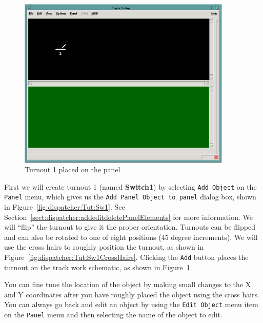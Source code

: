 \begin{figure}[hbpt] 
\begin{centering}
\includegraphics[width=4in]{DISPSimpleTutPanel1.png} 
\caption{Turnout 1 placed on the panel} 
\label{fig:dispatcher:Tut:panel1} 
\end{centering}
\end{figure} 
%
First we will create turnout 1 (named \textbf{Switch1}) by selecting
\texttt{Add Object} on the \texttt{Panel} menu, which gives us the
\texttt{Add Panel Object to panel} dialog box, shown in
Figure~\ref{fig:dispatcher:Tut:Sw1}. See
Section~\ref{sect:dispatcher:addeditdeletePanelElements} for more
information. We will ``flip'' the turnout to give it the proper
orientation. Turnouts can be flipped and can also be rotated to one of
eight positions (45 degree increments). We will use the cross hairs to
roughly position the turnout, as shown in
Figure~\ref{fig:dispatcher:Tut:Sw1CrossHairs}. Clicking the
\texttt{Add} button places the turnout on the track work schematic, as
shown in  Figure~\ref{fig:dispatcher:Tut:panel1}.  \begin{tip}You can
fine tune the location of the object by making small changes to the X
and Y coordinates after you have roughly placed the object using the
cross hairs. You can always go back and edit an object by using the
\texttt{Edit Object} menu item on the \texttt{Panel} menu and then
selecting the name of the object to edit.\end{tip}

\clearpage

